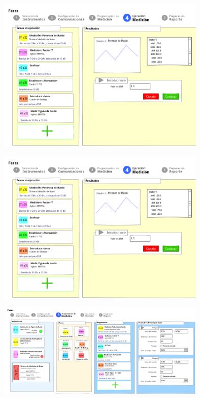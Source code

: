 \documentclass[paper=letter,oneside,fontsize=12pt, parskip=full]{article}
\begin{document}
	\begin{figure}[h!]
		\centering
		\includegraphics[width=10cm]{Imagenes/CommunicationsWindowSketchGui.png} 
	\end{figure}

	\begin{figure}[h!]
		\centering
		\includegraphics[width=10cm]{Imagenes/ExecutionWindowSketchGui.png} 
	\end{figure}

	\begin{figure}[h!]
		\centering
		\includegraphics[width=10cm]{Imagenes/ProgramWindowSketchGui.png} 
	\end{figure}
	
\end{document}
